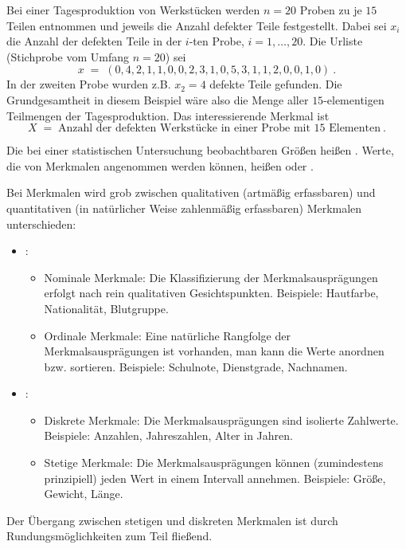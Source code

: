 \begin{MIntro}
\begin{MExample}
Bei einer Tagesproduktion von Werkstücken werden $n=20$ Proben zu je $15$ Teilen entnommen und jeweils die Anzahl defekter Teile festgestellt.
Dabei sei $x_i$ die Anzahl der defekten Teile in der $i$-ten Probe, $i=1,\ldots,20$. Die Urliste (Stichprobe vom Umfang $n=20$) sei
$$
x\; =\; (0,4,2,1,1,0,0,2,3,1,0,5,3,1,1,2,0,0,1,0)\: .
$$
In der zweiten Probe wurden z.B. $x_2=4$ defekte Teile gefunden. Die Grundgesamtheit in diesem Beispiel wäre also die Menge aller
$15$-elementigen Teilmengen der Tagesproduktion. Das interessierende Merkmal ist
$$
X\;=\; \text{Anzahl der defekten Werkstücke in einer Probe mit 15 Elementen}\: .
$$
\end{MExample}

\begin{MInfo}
Die bei einer statistischen Untersuchung beobachtbaren Größen heißen .
Werte, die von Merkmalen angenommen werden können, heißen  oder .
\end{MInfo}

Bei Merkmalen wird grob zwischen qualitativen (artmäßig erfassbaren) und quantitativen (in natürlicher Weise zahlenmäßig erfassbaren) Merkmalen unterschieden:
\begin{itemize}
\item{:\begin{itemize}
  \item{Nominale Merkmale: Die Klassifizierung der Merkmalsausprägungen erfolgt nach rein qualitativen Gesichtspunkten.
        Beispiele: Hautfarbe, Nationalität, Blutgruppe.}
  \item{Ordinale Merkmale: Eine natürliche Rangfolge der Merkmalsausprägungen ist vorhanden, man kann die Werte anordnen bzw. sortieren.
        Beispiele: Schulnote, Dienstgrade, Nachnamen.}
  \end{itemize}
  }
\item{:\begin{itemize}
  \item{Diskrete Merkmale: Die Merkmalsausprägungen sind isolierte Zahlwerte.
        Beispiele: Anzahlen, Jahreszahlen, Alter in Jahren.}
  \item{Stetige Merkmale: Die Merkmalsausprägungen können (zumindestens prinzipiell) jeden Wert in einem Intervall annehmen.
        Beispiele: Größe, Gewicht, Länge.}
  \end{itemize}
}
\end{itemize}

Der Übergang zwischen stetigen und diskreten Merkmalen ist durch Rundungsmöglichkeiten zum Teil fließend.

\end{MIntro}


